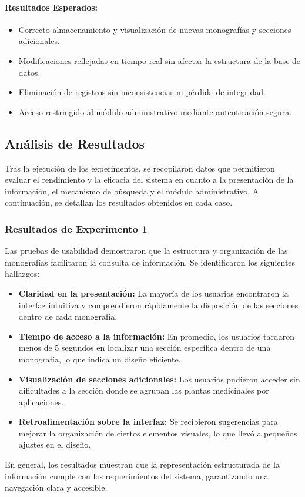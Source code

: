 \paragraph{Resultados Esperados:}
\begin{itemize}
    \item Correcto almacenamiento y visualización de nuevas monografías y secciones adicionales.
    \item Modificaciones reflejadas en tiempo real sin afectar la estructura de la base de datos.
    \item Eliminación de registros sin inconsistencias ni pérdida de integridad.
    \item Acceso restringido al módulo administrativo mediante autenticación segura.
\end{itemize}



\subsection{Análisis de Resultados}
Tras la ejecución de los experimentos, se recopilaron datos que permitieron evaluar el rendimiento y la eficacia del sistema en cuanto 
a la presentación de la información, el mecanismo de búsqueda y el módulo administrativo. A continuación, se detallan los resultados 
obtenidos en cada caso.

\subsubsection*{Resultados de Experimento 1}
Las pruebas de usabilidad demostraron que la estructura y organización de las monografías facilitaron la consulta de información. 
Se identificaron los siguientes hallazgos:
\begin{itemize}
    \item \textbf{Claridad en la presentación:} La mayoría de los usuarios encontraron la interfaz intuitiva y comprendieron rápidamente 
    la disposición de las secciones dentro de cada monografía.
    \item \textbf{Tiempo de acceso a la información:} En promedio, los usuarios tardaron menos de 5 segundos en localizar una sección específica 
    dentro de una monografía, lo que indica un diseño eficiente.
    \item \textbf{Visualización de secciones adicionales:} Los usuarios pudieron acceder sin dificultades a la sección donde se agrupan las
    plantas medicinales por aplicaciones.
    \item \textbf{Retroalimentación sobre la interfaz:} Se recibieron sugerencias para mejorar la organización de ciertos elementos visuales, 
    lo que llevó a pequeños ajustes en el diseño.
\end{itemize}
En general, los resultados muestran que la representación estructurada de la información cumple con los requerimientos del sistema, 
garantizando una navegación clara y accesible.

